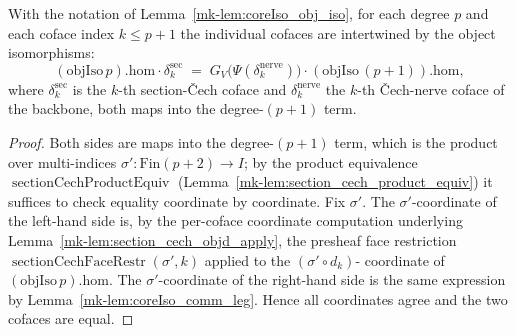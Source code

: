 \begin{lemma}\label{mk-lem:coreIso_comm_coface}
  \leanok

  With the notation of Lemma~\ref{mk-lem:coreIso_obj_iso}, for each degree \(p\) and each coface
  index \(k \le p+1\) the individual cofaces are intertwined by the object isomorphisms:
  \[
    (\mathrm{objIso}\,p).\mathrm{hom} \cdot \delta^{\mathrm{sec}}_k
      \;=\;
    G_V\bigl(\Psi(\delta^{\mathrm{nerve}}_k)\bigr) \cdot (\mathrm{objIso}\,(p+1)).\mathrm{hom},
  \]
  where \(\delta^{\mathrm{sec}}_k\) is the \(k\)-th section-{\v C}ech coface and
  \(\delta^{\mathrm{nerve}}_k\) the \(k\)-th {\v C}ech-nerve coface of the backbone, both maps
  into the degree-\((p+1)\) term.
\end{lemma}
\begin{proof}
  \leanok
  Both sides are maps into the degree-\((p+1)\) term, which is the product over multi-indices
  \(\sigma' : \mathrm{Fin}(p+2) \to I\); by the product equivalence
  \(\operatorname{sectionCechProductEquiv}\) (Lemma~\ref{mk-lem:section_cech_product_equiv}) it
  suffices to check equality coordinate by coordinate. Fix \(\sigma'\). The \(\sigma'\)-coordinate
  of the left-hand side is, by the per-coface coordinate computation underlying
  Lemma~\ref{mk-lem:section_cech_objd_apply}, the presheaf face restriction
  \(\operatorname{sectionCechFaceRestr}(\sigma', k)\) applied to the \((\sigma' \circ d_k)\)-
  coordinate of \((\mathrm{objIso}\,p).\mathrm{hom}\). The \(\sigma'\)-coordinate of the
  right-hand side is the same expression by Lemma~\ref{mk-lem:coreIso_comm_leg}. Hence all
  coordinates agree and the two cofaces are equal.
\end{proof}

